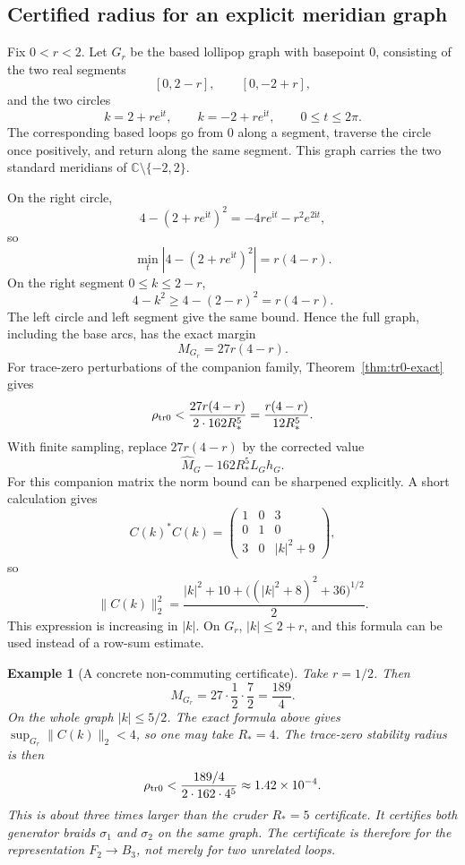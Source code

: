 \documentclass[11pt]{article}
\newtheorem{example}[theorem]{Example}
\numberwithin{equation}{section}
\newcommand{\bbC}{\mathbb C}
\newcommand{\ii}{\mathrm i}
\begin{document}
\subsection{Certified radius for an explicit meridian graph}

Fix \(0<r<2\).  Let \(G_r\) be the based lollipop graph with basepoint
\(0\), consisting of the two real segments
\[
  [0,2-r],\qquad [0,-2+r],
\]
and the two circles
\[
  k=2+re^{\ii t},\qquad k=-2+re^{\ii t},\qquad 0\le t\le2\pi.
\]
The corresponding based loops go from \(0\) along a segment, traverse the
circle once positively, and return along the same segment.  This graph
carries the two standard meridians of \(\bbC\setminus\{-2,2\}\).

On the right circle,
\[
  4-(2+re^{\ii t})^2=-4re^{\ii t}-r^2e^{2\ii t},
\]
so
\[
  \min_t |4-(2+re^{\ii t})^2|=r(4-r).
\]
On the right segment \(0\le k\le2-r\),
\[
  4-k^2\ge 4-(2-r)^2=r(4-r).
\]
The left circle and left segment give the same bound.  Hence the full graph,
including the base arcs, has the exact margin
\[
  M_{G_r}=27r(4-r).
\]
For trace-zero perturbations of the companion family, Theorem~\ref{thm:tr0-exact}
gives
\[
  \rho_{\rm tr0}
  <\frac{27r(4-r)}{2\cdot 162R_*^5}
  =\frac{r(4-r)}{12R_*^5}.
\]
With finite sampling, replace \(27r(4-r)\) by the corrected value
\[
  \widehat M_G-162R_*^5L_Gh_G.
\]
For this companion matrix the norm bound can be sharpened explicitly.  A
short calculation gives
\[
  C(k)^*C(k)=
  \begin{pmatrix}
  1&0&3\\
  0&1&0\\
  3&0&|k|^2+9
  \end{pmatrix},
\]
so
\[
  \|C(k)\|_2^2=
  \frac{|k|^2+10+\bigl((|k|^2+8)^2+36\bigr)^{1/2}}{2}.
\]
This expression is increasing in \(|k|\).  On \(G_r\), \(|k|\le2+r\), and
this formula can be used instead of a row-sum estimate.

\begin{example}[A concrete non-commuting certificate]
Take \(r=1/2\).  Then
\[
  M_{G_r}=27\cdot \frac12\cdot \frac72=\frac{189}{4}.
\]
On the whole graph \(|k|\le5/2\).  The exact formula above gives
\(\sup_{G_r}\|C(k)\|_2<4\), so one may take \(R_*=4\).  The trace-zero
stability radius is then
\[
  \rho_{\rm tr0}<\frac{189/4}{2\cdot 162\cdot 4^5}
  \approx1.42\times10^{-4}.
\]
This is about three times larger than the cruder \(R_*=5\) certificate.
It certifies both generator braids \(\sigma_1\) and \(\sigma_2\) on the
same graph.  The certificate is therefore for the representation
\(F_2\to B_3\), not merely for two unrelated loops.
\end{example}
\end{document}
